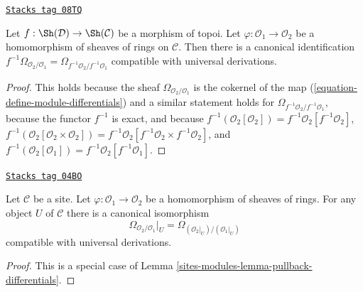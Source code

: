 \begin{lemma}
\label{sites-modules-lemma-pullback-differentials}
\href{https://stacks.math.columbia.edu/tag/08TQ}{\texttt{Stacks tag 08TQ}}

Let $f : \Sh(\mathcal{D}) \to \Sh(\mathcal{C})$ be a morphism of topoi.
Let $\varphi : \mathcal{O}_1 \to \mathcal{O}_2$
be a homomorphism of sheaves of rings on $\mathcal{C}$.
Then there is a canonical identification
$f^{-1}\Omega_{\mathcal{O}_2/\mathcal{O}_1} =
\Omega_{f^{-1}\mathcal{O}_2/f^{-1}\mathcal{O}_1}$
compatible with universal derivations.
\end{lemma}

\begin{proof}
This holds because the sheaf $\Omega_{\mathcal{O}_2/\mathcal{O}_1}$
is the cokernel of the map (\ref{equation-define-module-differentials})
and a similar statement holds for
$\Omega_{f^{-1}\mathcal{O}_2/f^{-1}\mathcal{O}_1}$,
because the functor $f^{-1}$ is exact, and because
$f^{-1}(\mathcal{O}_2[\mathcal{O}_2]) =
f^{-1}\mathcal{O}_2[f^{-1}\mathcal{O}_2]$,
$f^{-1}(\mathcal{O}_2[\mathcal{O}_2 \times \mathcal{O}_2]) =
f^{-1}\mathcal{O}_2[f^{-1}\mathcal{O}_2 \times f^{-1}\mathcal{O}_2]$, and
$f^{-1}(\mathcal{O}_2[\mathcal{O}_1]) =
f^{-1}\mathcal{O}_2[f^{-1}\mathcal{O}_1]$.
\end{proof}

\begin{lemma}
\label{sites-modules-lemma-localize-differentials}
\href{https://stacks.math.columbia.edu/tag/04BO}{\texttt{Stacks tag 04BO}}

Let $\mathcal{C}$ be a site. Let $\varphi : \mathcal{O}_1 \to \mathcal{O}_2$
be a homomorphism of sheaves of rings. For any object $U$ of $\mathcal{C}$
there is a canonical isomorphism
$$
\Omega_{\mathcal{O}_2/\mathcal{O}_1}|_U =
\Omega_{(\mathcal{O}_2|_U)/(\mathcal{O}_1|_U)}
$$
compatible with universal derivations.
\end{lemma}

\begin{proof}
This is a special case of Lemma \ref{sites-modules-lemma-pullback-differentials}.
\end{proof}

